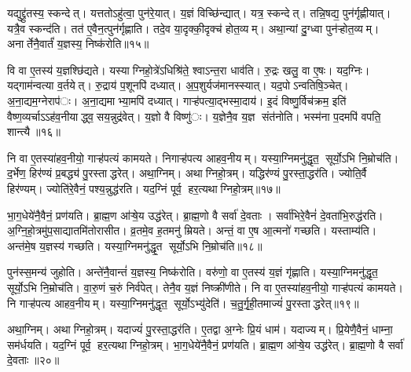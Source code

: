 यद्युद्द्रु॑तस्य॒ स्कन्देत्। यत्ततोऽहु॑त्वा॒ पुन॑रे॒यात्। य॒ज्ञं विच्छि॑न्द्यात्। यत्र॒ स्कन्देत्। तन्नि॒षद्य॒ पुन॑र्गृह्णीयात्। यत्रै॒व स्कन्द॑ति। तत॑ ए॒वैन॒त्पुन॑र्गृह्णाति। तदे॒व या॒दृक्की॒दृक्च॑ होत॒व्यम्। अथा॒न्यां दु॒ग्ध्वा पुन॑ऱ्होत॒व्यम्। अनार्तेनै॒वार्तं॑ य॒ज्ञस्य॒ निष्क॑रोति॥१५॥

वि वा ए॒तस्य॑ य॒ज्ञश्छि॑द्यते। यस्याग्निहो॒त्रे॑ऽधिश्रि॑ते॒ श्वाऽन्त॒रा धाव॑ति। रु॒द्रः खलु॒ वा ए॒षः। यद॒ग्निः। यद्गाम॑न्वत्या व॒र्तयेत्। रु॒द्राय॑ प॒शूनपि॑ दध्यात्। अ॒प॒शुर्यज॑मानस्स्यात्। यद॒पोऽन्वतिषि॒ञ्चेत्। अ॒ना॒द्यम॒ग्नेराप॑ः। अ॒ना॒द्यमाभ्या॒मपि॑ दध्यात्। गाऱ्ह॑पत्या॒द्भस्मा॒दाय॑। इ॒दं विष्णु॒र्विच॑क्रम॒ इति॑ वैष्ण॒व्यर्चाऽऽह॑व॒नीयाद्ध्व॒सय॒न्नुद्र॑वेत्। य॒ज्ञो वै विष्णु॑ः। य॒ज्ञेनै॒व य॒ज्ञ संत॑नोति। भस्म॑ना प॒दमपि॑ वपति॒ शान्त्यै॥१६॥


नि वा ए॒तस्या॑हव॒नीयो॒ गाऱ्ह॑पत्यं कामयते। निगाऱ्ह॑पत्य आहव॒नीयम्। यस्या॒ग्निमनु॑द्धृत॒ सूर्यो॒ऽभि नि॒म्रोच॑ति। द॒र्भेण॒ हिर॑ण्यं प्र॒बद्ध्य॑ पु॒रस्ताद्धरेत्। अथा॒ग्निम्। अथाग्निहो॒त्रम्। यद्धिर॑ण्यं पु॒रस्ता॒द्धर॑ति। ज्योति॒र्वै हिर॑ण्यम्। ज्योति॑रे॒वैनं॒ पश्य॒न्नुद्ध॑रति। यद॒ग्निं पूर्व॒ हर॒त्यथाग्निहो॒त्रम्॥१७॥

भा॒ग॒धेये॑नै॒वैनं॒ प्रण॑यति। ब्रा॒ह्म॒ण आ॑ऱ्षे॒य उद्ध॑रेत्। ब्रा॒ह्म॒णो वै सर्वा॑ दे॒वताः। सर्वा॑भिरे॒वैनं॑ दे॒वता॑भि॒रुद्ध॑रति। अ॒ग्नि॒हो॒त्रमु॑प॒साद्यातमि॑तोरासीत। व्र॒तमे॒व ह॒तमनु॑ म्रियते। अन्तं॒ वा ए॒ष आ॒त्मनो॑ गच्छति। यस्ताम्य॑ति। अन्त॑मे॒ष य॒ज्ञस्य॑ गच्छति। यस्या॒ग्निमनु॑द्धृ॒त सूर्यो॒ऽभि नि॒म्रोच॑ति॥१८॥

पुन॑स्स॒मन्य॑ जुहोति। अन्ते॑नै॒वान्तं॑ य॒ज्ञस्य॒ निष्क॑रोति। वरु॑णो॒ वा ए॒तस्य॑ य॒ज्ञं गृ॑ह्णाति। यस्या॒ग्निमनु॑द्धृत॒ सूर्यो॒ऽभि नि॒म्रोच॑ति। वा॒रु॒णं च॒रुं निर्व॑पेत्। तेनै॒व य॒ज्ञं निष्क्री॑णीते। नि वा ए॒तस्या॑हव॒नीयो॒ गाऱ्ह॑पत्यं कामयते। नि गाऱ्ह॑पत्य आहव॒नीयम्। यस्या॒ग्निमनु॑द्धृत॒ सूर्यो॒ऽभ्यु॑देति॑। च॒तु॒र्गृ॒ही॒तमाज्यं॑ पु॒रस्ताद्धरेत्॥१९॥

अथा॒ग्निम्। अथाग्निहो॒त्रम्। यदाज्यं॑ पु॒रस्ता॒द्धर॑ति। ए॒तद्वा अ॒ग्नेः प्रि॒यं धाम॑। यदाज्यम्। प्रि॒येणै॒वैनं॒ धाम्ना॒ सम॑र्धयति। यद॒ग्निं पूर्व॒ हर॒त्यथाग्निहो॒त्रम्। भा॒ग॒धेये॑नै॒वैनं॒ प्रण॑यति। ब्रा॒ह्म॒ण आ॑ऱ्षे॒य उद्ध॑रेत्। ब्रा॒ह्म॒णो वै सर्वा॑ दे॒वताः॥२०॥

